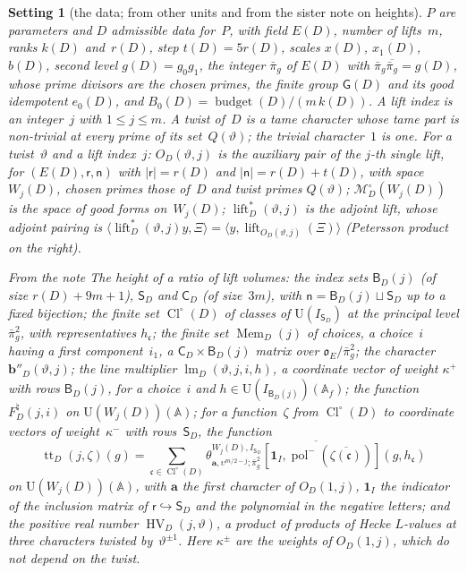 \documentclass[11pt,a4paper]{article}
\newcommand{\kw}[1]{\emph{#1}}
\newcommand{\m}[1]{\mbox{$#1$}}        %
\theoremstyle{plainx}
\theoremstyle{uprightx}
\newtheorem{setting}[theorem]{Setting}          %
\newcommand{\AAA}{\mathbb{A}}
\newcommand{\ix}[1]{\mathsf{#1}}
\newcommand{\OEr}{\mathfrak{o}_E}
\newcommand{\UU}{\mathrm{U}}
\newcommand{\ip}[2]{\langle #1,#2\rangle}
\newcommand{\tk}[7]{\theta^{#1,#2}_{#3,#4;#5}[#6,#7]}
\newcommand{\dsc}[1]{\operatorname{lift}_{#1}}
\newcommand{\Mgood}[1]{\mathcal{M}^{\circ}_D(W_{#1}(D))}
\newcommand{\alift}{\operatorname{lift}^{*}}
\newcommand{\lmult}[4]{\operatorname{lm}_D(#1,#2,#3,#4)}
\newcommand{\fnat}[2]{F^{\natural}_{D}(#1,#2)}
\newcommand{\ttheta}[2]{\operatorname{tt}_D(#1,#2)}
\newcommand{\HV}[2]{\operatorname{HV}_D(#1,#2)}
\newcommand{\Mem}[1]{\operatorname{Mem}_D(#1)}
\newcommand{\Bix}[1]{\mathsf{B}_D(#1)}
\newcommand{\Six}{\mathsf{S}_D}
\newcommand{\Cix}{\mathsf{C}_D}
\newcommand{\Scl}{\operatorname{Cl}^{\circ}(D)}
\begin{document}
\begin{setting}[the data; from other units and from the sister note on heights]\label{set:data}
$P$ are parameters and $D$ admissible data for~$P$, with field \m{E(D)}, number of lifts~$m$, ranks $k(D)$ and~$r(D)$,
step \m{t(D)=5r(D)}, scales $x(D)$, $x_1(D)$, $b(D)$, second level \m{g(D)=g_0g_1}, the integer \m{\bar\pi_g} of \m{E(D)} with
\m{\bar\pi_g\overline{\bar\pi_g}=g(D)}, whose prime divisors are the chosen primes, the finite group \m{\mathsf{G}(D)} and
its good idempotent \m{e_0(D)}, and \m{B_0(D)=\operatorname{budget}(D)/(m\,k(D))}. A lift index is an integer~$j$ with
\m{1\le j\le m}. A \kw{twist} of~$D$ is a tame character whose tame part is non-trivial at every prime of its
set~\m{Q(\vartheta)}; the trivial character~$1$ is one. For a twist~$\vartheta$ and a lift index~$j$:
\m{O_D(\vartheta,j)} is the auxiliary pair of the $j$-th single lift, for \m{(E(D),\ix r,\ix n)} with \m{|\ix r|=r(D)} and
\m{|\ix n|=r(D)+t(D)}, with space~$W_j(D)$, chosen primes those of~$D$ and twist primes \m{Q(\vartheta)}; \m{\Mgood{j}} is
the space of good forms on~$W_j(D)$; \m{\alift_D(\vartheta,j)} is the adjoint lift, whose adjoint pairing is
\m{\ip{\alift_D(\vartheta,j)y}{\Xi}=\ip{y}{\dsc{O_D(\vartheta,j)}(\Xi)}} (Petersson product on the right).

From the note \emph{The height of a ratio of lift volumes}: the index sets \m{\Bix{j}} (of size \m{r(D)+9m+1}),
\m{\Six} and \m{\Cix} (of size~$3m$), with \m{\ix n=\Bix{j}\sqcup\Six} up to a fixed bijection; the finite set
\m{\Scl} of classes of \m{\UU(I_{\Six})} at the principal level \m{\bar\pi_g^{2}}, with representatives
\m{h_{\mathfrak{c}}}; the finite set \m{\Mem{j}} of \kw{choices}, a choice~$i$ having a first component~$i_1$, a
\m{\Cix\times\Bix{j}} matrix over \m{\OEr/\bar\pi_g^{2}}; the character \m{\mathbf{b}''_D(\vartheta,j)}; the \kw{line
multiplier} \m{\lmult{\vartheta}{j}{i}{h}}, a coordinate vector of weight \m{\kappa^{+}} with rows \m{\Bix{j}}, for a
choice~$i$ and \m{h\in\UU(I_{\Bix{j}})(\AAA_f)}; the function \m{\fnat{j}{i}} on \m{\UU(W_j(D))(\AAA)}; for a
function~$\zeta$ from \m{\Scl} to coordinate vectors of weight~$\kappa^{-}$ with rows~$\Six$, the function
\[\ttheta{j}{\zeta}(g)=\sum_{\mathfrak{c}\in\Scl}\overline{\tk{W_j(D)}{I_{\Six}}{\mathbf{a}}{\upsilon^{m/2-j}}{\bar\pi_g^{2}}{\mathbf{1}_{I}}{\operatorname{pol}^{-}(\overline{\zeta(\mathfrak{c})})}(g,h_{\mathfrak{c}})}\]
on \m{\UU(W_j(D))(\AAA)}, with \m{\mathbf{a}} the first character of \m{O_D(1,j)}, \m{\mathbf{1}_I} the indicator of the
inclusion matrix of \m{\ix r\hookrightarrow\Six} and the polynomial in the negative letters; and the positive real
number \m{\HV{j}{\vartheta}}, a product of products of Hecke $L$-values at three characters twisted
by~$\vartheta^{\pm1}$. Here \m{\kappa^{\pm}} are the weights of \m{O_D(1,j)}, which do not depend on the twist.
\end{setting}
\end{document}
